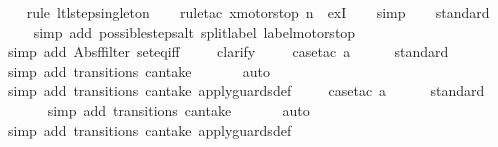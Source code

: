 \begin{isabellebody}
%
\isadelimproof
\ \ %
\endisadelimproof
%
\isatagproof
{}\isamarkupfalse%
\ {\isacharparenleft}rule\ ltl{\isacharunderscore}step{\isacharunderscore}singleton{\isacharparenright}\isanewline
\ \ \isamarkupfalse%
\ {\isacharparenleft}rule{\isacharunderscore}tac\ x{\isacharequal}{\isachardoublequoteopen}motorstop\ n{\isachardoublequoteclose}\ \ exI{\isacharparenright}\isanewline
\ \ \isamarkupfalse%
\ simp\isanewline
\ \ \isamarkupfalse%
\ standard\isanewline
\ \ \ \isamarkupfalse%
\ {\isacharparenleft}simp\ add{\isacharcolon}\ possible{\isacharunderscore}steps{\isacharunderscore}alt{}\ split{\isacharunderscore}label\ label{\isacharunderscore}motorstop{\isacharparenright}\isanewline
\ \ \ \isamarkupfalse%
\ {\isacharparenleft}simp\ add{\isacharcolon}\ Abs{\isacharunderscore}ffilter\ set{\isacharunderscore}eq{\isacharunderscore}iff{\isacharparenright}\isanewline
\ \ \ \isamarkupfalse%
\ clarify\isanewline
\ \ \ \isamarkupfalse%
\ {\isacharparenleft}case{\isacharunderscore}tac\ {\isachardoublequoteopen}a{\isacharequal}{}{\isachardoublequoteclose}{\isacharparenright}\isanewline
\ \ \ \ \isamarkupfalse%
\ standard\isanewline
\ \ \ \ \ \isamarkupfalse%
\ {\isacharparenleft}simp\ add{\isacharcolon}\ transitions\ can{\isacharunderscore}take{\isacharparenright}\isanewline
\ \ \ \ \ \isamarkupfalse%
\ auto{\isacharbrackleft}{}{\isacharbrackright}\isanewline
\ \ \ \ \isamarkupfalse%
\ {\isacharparenleft}simp\ add{\isacharcolon}\ transitions\ can{\isacharunderscore}take\ apply{\isacharunderscore}guards{\isacharunderscore}def{\isacharparenright}\isanewline
\ \ \ \isamarkupfalse%
\ {\isacharparenleft}case{\isacharunderscore}tac\ {\isachardoublequoteopen}a{\isacharequal}{}{\isachardoublequoteclose}{\isacharparenright}\isanewline
\ \ \ \ \isamarkupfalse%
\ standard\isanewline
\ \ \ \ \ \isamarkupfalse%
\ {\isacharparenleft}simp\ add{\isacharcolon}\ transitions\ can{\isacharunderscore}take{\isacharparenright}\isanewline
\ \ \ \ \ \isamarkupfalse%
\ auto{\isacharbrackleft}{}{\isacharbrackright}\isanewline
\ \ \ \ \isamarkupfalse%
\ {\isacharparenleft}simp\ add{\isacharcolon}\ transitions\ can{\isacharunderscore}take\ apply{\isacharunderscore}guards{\isacharunderscore}def{\isacharparenright}\isanewline

\end{isabellebody}

